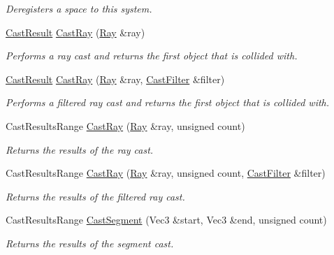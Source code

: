 \begin{DoxyCompactItemize}
\begin{DoxyCompactList}\small\item\em Deregisters a space to this system. \end{DoxyCompactList}\item 
\hyperlink{structDCEngine_1_1CastResult}{Cast\-Result} \hyperlink{classDCEngine_1_1Systems_1_1Physics_a78eeead3cd3e5befab70292b27d06cb7}{Cast\-Ray} (\hyperlink{structDCEngine_1_1Ray}{Ray} \&ray)
\begin{DoxyCompactList}\small\item\em Performs a ray cast and returns the first object that is collided with. \end{DoxyCompactList}\item 
\hyperlink{structDCEngine_1_1CastResult}{Cast\-Result} \hyperlink{classDCEngine_1_1Systems_1_1Physics_a0d08cbe2430fe1b685897f64292e51b8}{Cast\-Ray} (\hyperlink{structDCEngine_1_1Ray}{Ray} \&ray, \hyperlink{structDCEngine_1_1CastFilter}{Cast\-Filter} \&filter)
\begin{DoxyCompactList}\small\item\em Performs a filtered ray cast and returns the first object that is collided with. \end{DoxyCompactList}\item 
Cast\-Results\-Range \hyperlink{classDCEngine_1_1Systems_1_1Physics_a0fdbbf6cd3836a5684bbee34e03cac45}{Cast\-Ray} (\hyperlink{structDCEngine_1_1Ray}{Ray} \&ray, unsigned count)
\begin{DoxyCompactList}\small\item\em Returns the results of the ray cast. \end{DoxyCompactList}\item 
Cast\-Results\-Range \hyperlink{classDCEngine_1_1Systems_1_1Physics_a71c3da317accdb31821da671b4a9c8ce}{Cast\-Ray} (\hyperlink{structDCEngine_1_1Ray}{Ray} \&ray, unsigned count, \hyperlink{structDCEngine_1_1CastFilter}{Cast\-Filter} \&filter)
\begin{DoxyCompactList}\small\item\em Returns the results of the filtered ray cast. \end{DoxyCompactList}\item 
Cast\-Results\-Range \hyperlink{classDCEngine_1_1Systems_1_1Physics_ae016fa032c636564fa3790361005cd05}{Cast\-Segment} (Vec3 \&start, Vec3 \&end, unsigned count)
\begin{DoxyCompactList}\small\item\em Returns the results of the segment cast. \end{DoxyCompactList}\item 

\end{DoxyCompactItemize}
